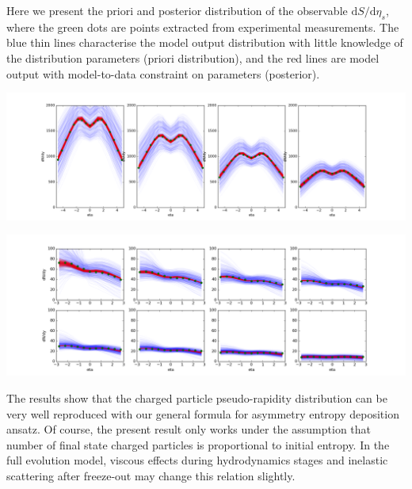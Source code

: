 \documentclass[aps,prl,twocolumn,groupedaddress]{revtex4-1}
\begin{document}
	Here we present the priori and posterior distribution of the observable $\mathrm{d}S/\mathrm{d}\eta_s$, where the green dots are points extracted from experimental measurements. 
	The blue thin lines characterise the model output distribution with little knowledge of the distribution parameters (priori distribution), and the red lines are model output with model-to-data constraint on parameters (posterior).
	
	\includegraphics[width=\columnwidth]{pics/pri-post-PbPb.png}
	
	\includegraphics[width=\columnwidth]{pics/pri-post-pPb.png}

	The results show that the charged particle pseudo-rapidity distribution can be very well reproduced with our general formula for asymmetry entropy deposition ansatz.
	Of course, the present result only works under the assumption that number of final state charged particles is proportional to initial entropy. 
	In the full evolution model, viscous effects during hydrodynamics stages and inelastic scattering after freeze-out may change this relation slightly.
	 
\end{document}
